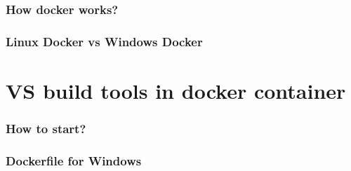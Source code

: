 \documentclass{beamer}
\begin{document}
\begin{frame}
\frametitle{How docker works?}
\end{frame}

\begin{frame}
\frametitle{Linux Docker vs Windows Docker}
\end{frame}

\section[VS build tools in docker container]{VS build tools in docker container}

\begin{frame}
\frametitle{How to start?}
\end{frame}

\begin{frame}
\frametitle{Dockerfile for Windows}
\end{frame}
\end{document}
